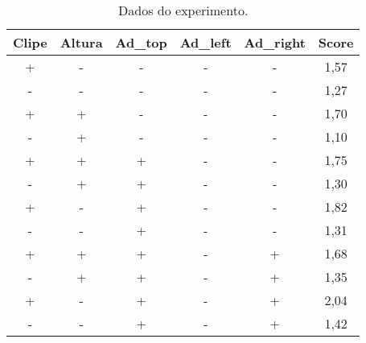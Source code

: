     \begin{table}[H]
        \centering
        \caption{Dados do experimento.}
        \begin{tabular}{|c|c|c|c|c|c|}
        \hline
        \rowcolor[HTML]{EFEFEF} 
        \textbf{Clipe} & \textbf{Altura} & \textbf{Ad\_top} & \textbf{Ad\_left} & \textbf{Ad\_right} & \textbf{Score} \\ \hline
        +              & -               & -                & -                 & -                  & 1,57           \\ \hline
        \rowcolor[HTML]{EFEFEF} 
        -              & -               & -                & -                 & -                  & 1,27           \\ \hline
        +              & +               & -                & -                 & -                  & 1,70           \\ \hline
        \rowcolor[HTML]{EFEFEF} 
        -              & +               & -                & -                 & -                  & 1,10           \\ \hline
        +              & +               & +                & -                 & -                  & 1,75           \\ \hline
        \rowcolor[HTML]{EFEFEF} 
        -              & +               & +                & -                 & -                  & 1,30           \\ \hline
        +              & -               & +                & -                 & -                  & 1,82           \\ \hline
        \rowcolor[HTML]{EFEFEF} 
        -              & -               & +                & -                 & -                  & 1,31           \\ \hline
        +              & +               & +                & -                 & +                  & 1,68           \\ \hline
        \rowcolor[HTML]{EFEFEF} 
        -              & +               & +                & -                 & +                  & 1,35           \\ \hline
        +              & -               & +                & -                 & +                  & 2,04           \\ \hline
        \rowcolor[HTML]{EFEFEF} 
        -              & -               & +                & -                 & +                  & 1,42           \\ \hline

\end{tabular}
\end{table}
